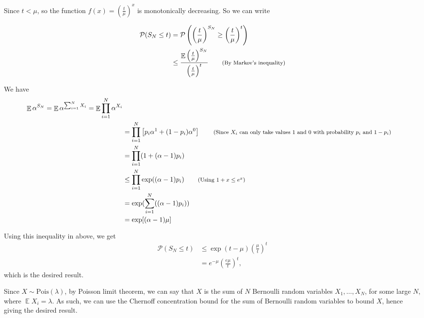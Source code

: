 \documentclass[11pt]{article}
\newenvironment{exercise}[2][Exercise]{\begin{trivlist}
\item[\hskip \labelsep {\bfseries #1}\hskip \labelsep {\bfseries #2.}]}{\end{trivlist}}
\newenvironment{solution}[1][Solution]{\begin{trivlist}
\item[\hskip \labelsep {\bfseries #1}\hskip \labelsep]}{\end{trivlist}}
\DeclareMathOperator*{\E}{\mathbb{E}}
\newcommand*{\annot}[1]{\tag*{\footnotesize{(#1)}}}
\begin{document}
\begin{exercise}{2.3.2}
\end{exercise}

\begin{solution}
Since $t<\mu$, so the function $f(x) = \left(\frac{t}{\mu}\right)^x$ is monotonically decreasing. So we can write

\begin{align*}
\mathcal{P}( S_N \leq t ) &= \mathcal{P}\left( \left( \frac{t}{\mu} \right)^{S_N} \geq \left( \frac{t}{\mu} \right)^t \right) \\
	&\leq \frac{\E \left( \frac{t}{\mu} \right)^{S_N}}{\left( \frac{t}{\mu} \right)^t} \annot{By Markov's inequality} \\
\end{align*}

We have
\begin{align*}
\E \alpha^{S_N} = \E \alpha^{\sum_{i=1}^N X_i} = \E \prod_{i=1}^N \alpha^{X_i} \\
				&= \prod_{i=1}^N \left[ p_i \alpha^1 + (1-p_i)\alpha^0 \right] \annot{Since $X_i$ can only take values 1 and 0 with probability $p_i$ and $1-p_i$} \\
				&= \prod_{i=1}^N (1 + (\alpha - 1)p_i) \\
				&\leq \prod_{i=1}^N \exp ((\alpha - 1)p_i) \annot{Using $1+x \leq e^x$} \\
				&= \exp(\sum_{i=1}^N ((\alpha - 1)p_i)) \\
				&= \exp[(\alpha - 1)\mu] \\
\end{align*}

Using this inequality in above, we get
\begin{align*}
\mathcal{P}( S_N \leq t ) &\leq \exp(t-\mu)\left( \frac{\mu}{t}\right)^t \\
				&= e^{-\mu}\left(\frac{e\mu}{t} \right)^t,
\end{align*}
which is the desired result.
\end{solution}

\begin{exercise}{2.3.3}
\end{exercise}

\begin{solution}
Since $X \sim \text{Pois}(\lambda)$, by Poisson limit theorem, we can say that $X$ is the sum of $N$ Bernoulli random variables $X_1, \ldots, X_N$, for some large $N$, where $\E X_i = \lambda$. As such, we can use the Chernoff concentration bound for the sum of Bernoulli random variables to bound $X$, hence giving the desired result.
\end{solution}
\end{document}
